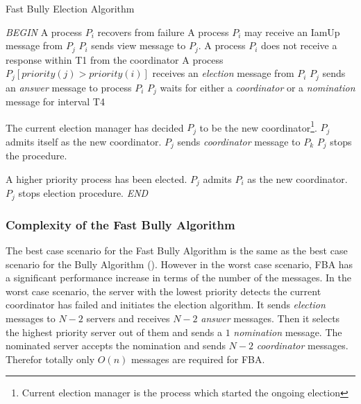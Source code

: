 \documentclass[dareport.tex]{subfiles}
\begin{document}
\begin{algorithm}[H]
	\caption{Fast Bully Election Algorithm}
	\label{fast-bully-algorithm}
	\begin{algorithmic}[1]
		\BState \emph{BEGIN}
		\State A process $P_{i}$ recovers from failure
			\State\indent{}
		\State A process $P_{i}$ may receive an IamUp message from $P_{j}$
			\State\indent $P_{i}$ sends view message to $P_{j}$.
		\State A process $P_{i}$ does not receive a response within T1 from the coordinator
			\State\indent{}
		\State A process $P_{j} \left[priority(j) > priority(i)\right]$ receives an \emph{election} message from $P_{i}$
			\State\indent $P_{j}$ sends an \emph{answer} message to process $P_{i}$
			\State\indent $P_{j}$ waits for either a \emph{coordinator} or a \emph{nomination} message for interval T4
			\State{}
				\State\indent\indent{}
			
			
			\Comment The current election manager has decided $P_{j}$ to be the new coordinator\footnote{Current election manager is the process which started the ongoing election}.
				\State\indent $P_{j}$ admits itself as the new coordinator.
				\State{}
					\State\indent\indent $P_{j}$ sends \emph{coordinator} message to $P_{k}$
					\State\indent\indent $P_{j}$ stops the procedure.
			
			\Comment A higher priority process has been elected.
				\State\indent $P_{j}$ admits $P_{i}$ as the new coordinator.
				\State\indent $P_{j}$ stops election procedure.
		\BState \emph{END}
	\end{algorithmic}
\end{algorithm}
\subsubsection{Complexity of the Fast Bully Algorithm}
The best case scenario for the Fast Bully Algorithm is the same as the best case scenario for the Bully Algorithm (). However in the worst case scenario, FBA has a significant performance increase in terms of the number of the messages. In the worst case scenario, the server with the lowest priority detects the current coordinator has failed and initiates the election algorithm. It sends \emph{election} messages to $ N-2 $ servers and receives $ N-2 $ \emph{answer} messages. Then it selects the highest priority server out of them and sends a $ 1 $ \emph{nomination} message. The nominated server accepts the nomination and sends $ N-2 $ \emph{coordinator} messages. Therefor totally only $ O(n) $ messages are required for FBA.
\end{document}
